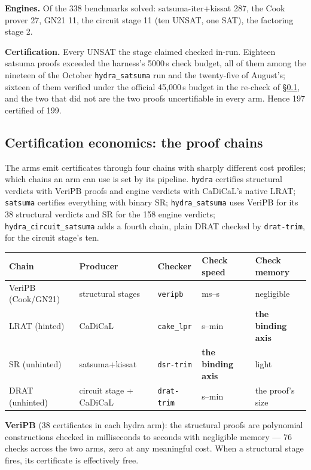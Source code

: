 \documentclass[10pt]{article}
\begin{document}
\textbf{Engines.} Of the 338 benchmarks solved: satsuma-iter+kissat
287, the Cook prover 27, GN21 11, the circuit stage 11 (ten UNSAT, one
SAT), the factoring stage 2.

\textbf{Certification.} Every UNSAT the stage claimed checked in-run.
Eighteen satsuma proofs exceeded the harness's 5000\,s check budget,
all of them among the nineteen of the October \texttt{hydra\_satsuma}
run and the twenty-five of August's; sixteen of them verified under the
official 45{,}000\,s budget in the re-check of \S\ref{sec:budgetnote},
and the two that did not are the two proofs uncertifiable in every arm.
Hence 197 certified of 199.

\subsection{Certification economics: the proof chains}
\label{sec:budgetnote}

The arms emit certificates through four chains with sharply
different cost profiles; which chains an arm can use is set by its
pipeline. \texttt{hydra} certifies structural verdicts with VeriPB
proofs and engine verdicts with CaDiCaL's native LRAT;
\texttt{satsuma} certifies everything with binary SR;
\texttt{hydra\_satsuma} uses VeriPB for its 38 structural verdicts
and SR for the 158 engine verdicts; \texttt{hydra\_circuit\_satsuma}
adds a fourth chain, plain DRAT checked by \texttt{drat-trim}, for the
circuit stage's ten.

\begin{center}
\begin{tabular}{@{}lllll@{}}
\toprule
Chain & Producer & Checker & Check speed & Check memory \\
\midrule
VeriPB (Cook/GN21) & structural stages & \texttt{veripb} & ms--s & negligible \\
LRAT (hinted) & CaDiCaL & \texttt{cake\_lpr} & s--min & \textbf{the binding axis} \\
SR (unhinted) & satsuma+kissat & \texttt{dsr-trim} & \textbf{the binding axis} & light \\
DRAT (unhinted) & circuit stage + CaDiCaL & \texttt{drat-trim} & s--min & the proof's size \\
\bottomrule
\end{tabular}
\end{center}

\textbf{VeriPB} (38 certificates in each hydra arm): the structural
proofs are polynomial constructions checked in milliseconds to
seconds with negligible memory --- 76 checks across the two arms,
zero at any meaningful cost. When a structural stage fires, its
certificate is effectively free.
\end{document}
